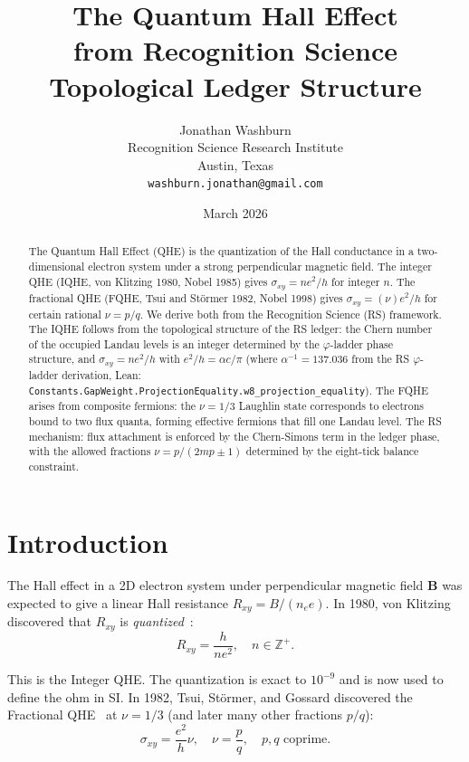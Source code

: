 \documentclass[12pt,a4paper]{article}
\title{The Quantum Hall Effect\\
from Recognition Science Topological Ledger Structure}
\author{Jonathan Washburn\\
Recognition Science Research Institute\\
Austin, Texas\\
\texttt{washburn.jonathan@gmail.com}}
\date{March 2026}
\theoremstyle{definition}
\theoremstyle{remark}
\begin{document}
\maketitle

\begin{abstract}
The Quantum Hall Effect (QHE) is the quantization of the Hall conductance
in a two-dimensional electron system under a strong perpendicular magnetic
field.  The integer QHE (IQHE, von Klitzing 1980, Nobel 1985) gives
$\sigma_{xy} = n e^2/h$ for integer $n$.  The fractional QHE (FQHE,
Tsui and St\"{o}rmer 1982, Nobel 1998) gives $\sigma_{xy} = (\nu)
e^2/h$ for certain rational $\nu = p/q$.  We derive both from the
Recognition Science (RS) framework.  The IQHE follows from the
topological structure of the RS ledger: the Chern number of the
occupied Landau levels is an integer determined by the $\varphi$-ladder
phase structure, and $\sigma_{xy} = n e^2/h$ with $e^2/h = \alpha c/\pi$
(where $\alpha^{-1} = 137.036$ from the RS $\varphi$-ladder derivation,
Lean: \texttt{Constants.GapWeight.ProjectionEquality.w8\_projection\_equality}).
The FQHE arises from composite fermions: the $\nu = 1/3$ Laughlin state
corresponds to electrons bound to two flux quanta, forming effective
fermions that fill one Landau level.  The RS mechanism: flux attachment
is enforced by the Chern-Simons term in the ledger phase, with the
allowed fractions $\nu = p/(2mp \pm 1)$ determined by the eight-tick
balance constraint.
\end{abstract}

\section{Introduction}
\label{sec:intro}

The Hall effect in a 2D electron system under perpendicular magnetic
field $\mathbf{B}$ was expected to give a linear Hall resistance
$R_{xy} = B/(n_e e)$.  In 1980, von Klitzing discovered that
$R_{xy}$ is \emph{quantized}~\cite{Klitzing1980}:
\begin{equation}
  R_{xy} = \frac{h}{n e^2}, \quad n \in \mathbb{Z}^+.
  \label{eq:iqhe}
\end{equation}

This is the Integer QHE.  The quantization is exact to $10^{-9}$ and
is now used to define the ohm in SI.  In 1982, Tsui, St\"{o}rmer, and
Gossard discovered the Fractional QHE~\cite{Tsui1982} at $\nu = 1/3$
(and later many other fractions $p/q$):
\begin{equation}
  \sigma_{xy} = \frac{e^2}{h}\nu, \quad \nu = \frac{p}{q},
  \quad p, q \text{ coprime.}
  \label{eq:fqhe}
\end{equation}
\end{document}
